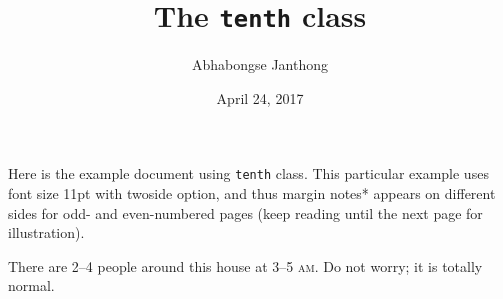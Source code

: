 \documentclass[11pt,twoside]{tenth}
\title{The \texttt{tenth} class}
\author{Abhabongse Janthong}
\date{April 24, 2017}
\begin{document}
    \maketitle

    Here is the example document using \texttt{tenth} class. This particular example uses font size 11pt with twoside option, and thus margin notes*  appears on different sides for odd- and even-numbered pages (keep reading until the next page for illustration).

    \lipsum[1-4]

    There are 2--4 people around this house at 3--5 \textsc{am}.  Do not worry; it is totally normal.
\end{document}
